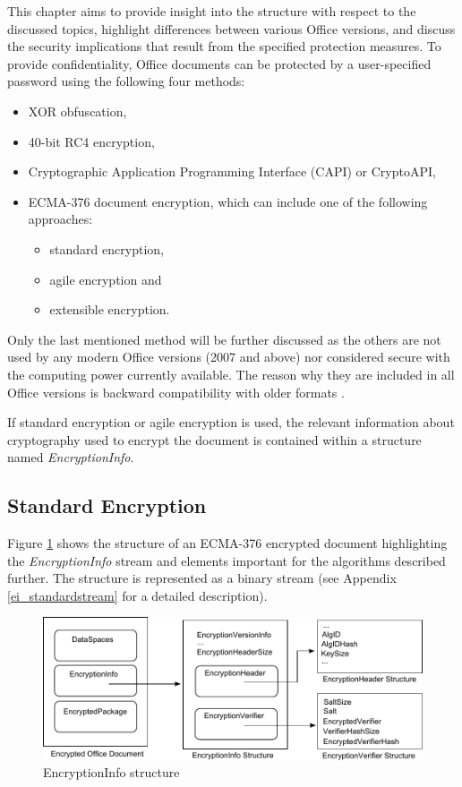 \documentclass[11pt,oneside]{fithesis2}
\begin{document}
This chapter aims to provide insight into the structure with respect to the discussed topics, highlight differences between various Office versions, and discuss the security implications that result from the specified protection measures.
To provide confidentiality, Office documents can be protected by a user-specified password using the following four methods:
\begin{itemize}
\setlength\itemsep{0.1em}
\item{XOR obfuscation,}
\item{40-bit RC4 encryption,}
\item{Cryptographic Application Programming Interface (CAPI) or CryptoAPI,}
\item{ECMA-376 document encryption, which can include one of the following approaches: }
	\begin{itemize}
	\setlength\itemsep{0.1em}
	\item{standard encryption,}
	\item{agile encryption and}
	\item{extensible encryption.}
	\end{itemize}
\end{itemize}

Only the last mentioned method will be further discussed as the others are not used by any modern Office versions (2007 and above) nor considered secure with the computing power currently available. The reason why they are included in all Office versions is backward compatibility with older formats \cite{msoffcrypto}.

If standard encryption or agile encryption is used, the relevant information about cryptography used to encrypt the document is contained within a structure named \textit{EncryptionInfo}.

\subsection{Standard Encryption} \label{msoff_standard_enc}

Figure \ref{keys_length} shows the structure of an ECMA-376 encrypted document highlighting the \textit{EncryptionInfo} stream and elements important for the algorithms described further. The structure is represented as a binary stream (see Appendix \ref{ei_standardstream} for a detailed description).

\begin{figure}[ht]
	\centering
	\includegraphics[width=1\textwidth]{figures/ei_struct.pdf}
	\caption{EncryptionInfo structure}
	\label{keys_length}
\end{figure}
\end{document}
